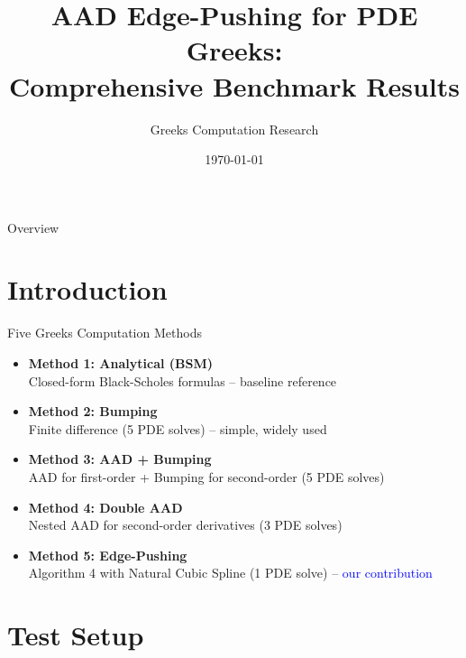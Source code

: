 \documentclass[aspectratio=169]{beamer}
\title{AAD Edge-Pushing for PDE Greeks:\\Comprehensive Benchmark Results}
\author{Greeks Computation Research}
\date{\today}
\begin{document}
\frame{\titlepage}

\begin{frame}{Overview}
\tableofcontents
\end{frame}

\section{Introduction}

\begin{frame}{Five Greeks Computation Methods}
\begin{itemize}
    \item \textbf{Method 1: Analytical (BSM)} \\
    Closed-form Black-Scholes formulas -- baseline reference

    \item \textbf{Method 2: Bumping} \\
    Finite difference (5 PDE solves) -- simple, widely used

    \item \textbf{Method 3: AAD + Bumping} \\
    AAD for first-order + Bumping for second-order (5 PDE solves)

    \item \textbf{Method 4: Double AAD} \\
    Nested AAD for second-order derivatives (3 PDE solves)

    \item \textbf{Method 5: Edge-Pushing} \\
    Algorithm 4 with Natural Cubic Spline (1 PDE solve) -- \textcolor{blue}{our contribution}
\end{itemize}
\end{frame}

\section{Test Setup}
\end{document}
